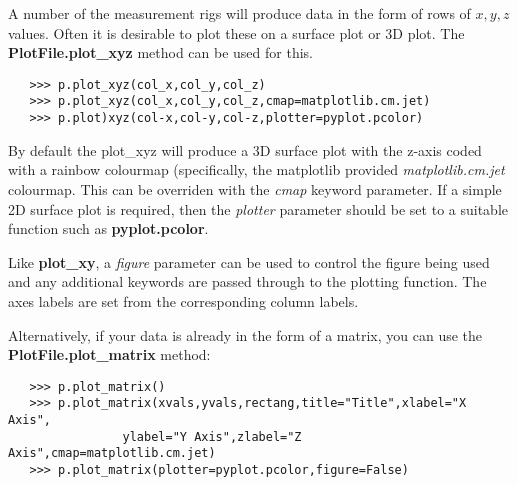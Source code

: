\documentclass[a4paper,11pt]{scrartcl}
\begin{document}
 A number of the measurement rigs will produce data in the form of rows of $x,y,z$ values. Often it is desirable to plot these on a surface plot or 3D plot. The \textbf{PlotFile.plot\_xyz} method can be used for this.

 \begin{verbatim}
   >>> p.plot_xyz(col_x,col_y,col_z)
   >>> p.plot_xyz(col_x,col_y,col_z,cmap=matplotlib.cm.jet)
   >>> p.plot)xyz(col-x,col-y,col-z,plotter=pyplot.pcolor)
 \end{verbatim}

 By default the plot\_xyz will produce a 3D surface plot with the z-axis coded with a rainbow colourmap (specifically, the matplotlib provided \textit{matplotlib.cm.jet} colourmap. This can be overriden with the \textit{cmap} keyword parameter. If a simple 2D surface plot is required, then the \textit{plotter} parameter should be set to a suitable function such as \textbf{pyplot.pcolor}.

 Like \textbf{plot\_xy}, a \textit{figure} parameter can be used to control the figure being used and any additional keywords are passed through to the plotting function. The axes labels are set from the corresponding column labels.

 Alternatively, if your data is already in the form of a matrix, you can use the \textbf{PlotFile.plot\_matrix} method:

 \begin{verbatim}
   >>> p.plot_matrix()
   >>> p.plot_matrix(xvals,yvals,rectang,title="Title",xlabel="X Axis",
                ylabel="Y Axis",zlabel="Z Axis",cmap=matplotlib.cm.jet)
   >>> p.plot_matrix(plotter=pyplot.pcolor,figure=False)
 \end{verbatim}
\end{document}
